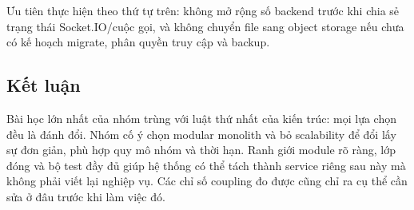 \documentclass[11pt, a4paper]{article}
\begin{document}
Ưu tiên thực hiện theo thứ tự trên: không mở rộng số backend trước khi chia sẻ trạng thái Socket.IO/cuộc gọi, và không chuyển file sang object storage nếu chưa có kế hoạch migrate, phân quyền truy cập và backup.

\subsection{Kết luận}
Bài học lớn nhất của nhóm trùng với luật thứ nhất của kiến trúc: mọi lựa chọn đều là đánh đổi. Nhóm cố ý chọn modular monolith và bỏ scalability để đổi lấy sự đơn giản, phù hợp quy mô nhóm và thời hạn. Ranh giới module rõ ràng, lớp đóng và bộ test đầy đủ giúp hệ thống có thể tách thành service riêng sau này mà không phải viết lại nghiệp vụ. Các chỉ số coupling đo được cũng chỉ ra cụ thể cần sửa ở đâu trước khi làm việc đó.

\nocite{bass2021practice, clements2010views}


\end{document}
